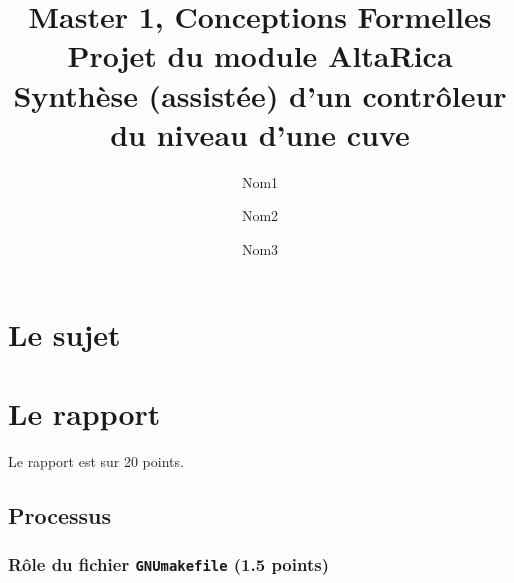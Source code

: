 \documentclass[a4paper]{book}
\newcommand{\altarica}{{\sc AltaRica}}
\begin{document}
\title{Master 1, Conceptions Formelles\\
Projet du module \altarica\\
Synthèse (assistée) d'un contrôleur du niveau d'une cuve}

\date{}

\author{Nom1 \and Nom2 \and Nom3}

\maketitle

\chapter{Le sujet}


\chapter{Le rapport}
Le rapport est sur 20 points.

\section{Processus}

\subsection{Rôle du fichier {\tt GNUmakefile} (1.5 points)}
\end{document}

